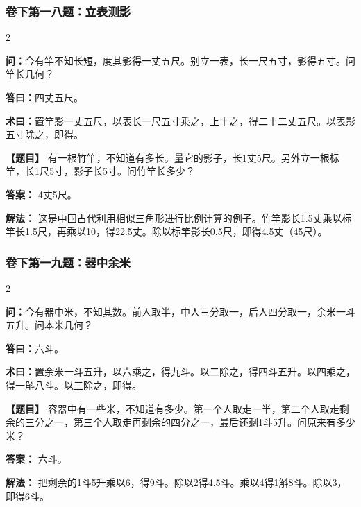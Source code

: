 \documentclass[11pt,a4paper]{article}
\begin{document}
\vspace{0.3cm}

\subsubsection*{卷下第一八题：立表测影}
\begin{paracol}{2}
\begin{problemclassical}
\textbf{问：}今有竿不知长短，度其影得一丈五尺。别立一表，长一尺五寸，影得五寸。问竿长几何？

\textbf{答曰：}四丈五尺。

\textbf{术曰：}置竿影一丈五尺，以表长一尺五寸乘之，上十之，得二十二丈五尺。以表影五寸除之，即得。
\end{problemclassical}
\switchcolumn
\begin{problemmodern}
\textbf{【题目】} 有一根竹竿，不知道有多长。量它的影子，长1丈5尺。另外立一根标竿，长1尺5寸，影子长5寸。问竹竿长多少？

\textbf{答案：} 4丈5尺。

\textbf{解法：} 这是中国古代利用相似三角形进行比例计算的例子。竹竿影长1.5丈乘以标竿长1.5尺，再乘以10，得22.5丈。除以标竿影长0.5尺，即得4.5丈（45尺）。
\end{problemmodern}
\end{paracol}

\vspace{0.3cm}

\subsubsection*{卷下第一九题：器中余米}
\begin{paracol}{2}
\begin{problemclassical}
\textbf{问：}今有器中米，不知其数。前人取半，中人三分取一，后人四分取一，余米一斗五升。问本米几何？

\textbf{答曰：}六斗。

\textbf{术曰：}置余米一斗五升，以六乘之，得九斗。以二除之，得四斗五升。以四乘之，得一斛八斗。以三除之，即得。
\end{problemclassical}
\switchcolumn
\begin{problemmodern}
\textbf{【题目】} 容器中有一些米，不知道有多少。第一个人取走一半，第二个人取走剩余的三分之一，第三个人取走再剩余的四分之一，最后还剩1斗5升。问原来有多少米？

\textbf{答案：} 六斗。

\textbf{解法：} 把剩余的1斗5升乘以6，得9斗。除以2得4.5斗。乘以4得1斛8斗。除以3，即得6斗。
\end{problemmodern}
\end{paracol}
\end{document}
